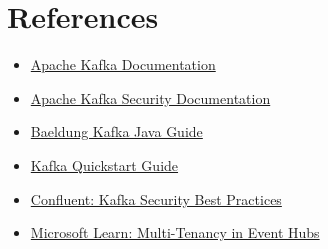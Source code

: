 \documentclass[12pt,a4paper]{report}
\begin{document}
\chapter*{References}
\begin{itemize}
    \item \href{https://kafka.apache.org/documentation/}{Apache Kafka Documentation}\autocite{kafka2025}
    \item \href{https://kafka.apache.org/documentation/#security}{Apache Kafka Security Documentation}\autocite{kafka2025}
    \item \href{https://www.baeldung.com/kafka-java}{Baeldung Kafka Java Guide}
    \item \href{https://kafka.apache.org/quickstart}{Kafka Quickstart Guide}
    \item \href{https://www.confluent.io/blog/kafka-security-best-practices/}{Confluent: Kafka Security Best Practices}
    \item \href{https://learn.microsoft.com/en-us/azure/architecture/guide/multitenant/service/event-hubs}{Microsoft Learn: Multi-Tenancy in Event Hubs}
\end{itemize}
\end{document}
